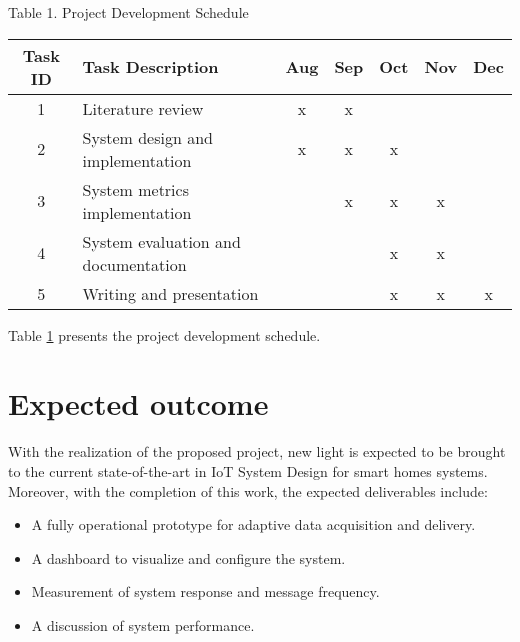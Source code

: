 \documentclass[12pt]{article}
\begin{document}
\begin{table}[h!]
\centering
Table 1. Project Development Schedule
\begin{tabular}{|c|l| c c c c c|}
\hline
Task ID & Task Description & Aug & Sep & Oct & Nov & Dec  \\
\hline
1 & Literature review & x & x &   &   &   \\
2 & System design and implementation & x & x & x &   &   \\
3 & System metrics implementation &   & x & x & x &   \\
4 & System evaluation and documentation &   &   & x & x &   \\
5 & Writing and presentation &   &   & x & x & x  \\
\hline
\end{tabular}
\label{table:1}
\end{table}

Table \ref{table:1} presents the project development schedule.

\section{Expected outcome}

With the realization of the proposed project, new light is expected to be brought to the current state-of-the-art in IoT System Design for smart homes systems. Moreover, with the completion of this work, the expected deliverables include:

\begin{itemize}
\item A fully operational prototype for adaptive data acquisition and delivery.
\item A dashboard to visualize and configure the system.
\item Measurement of system response and message frequency.
\item A discussion of system performance.
\end{itemize}



\end{document}
